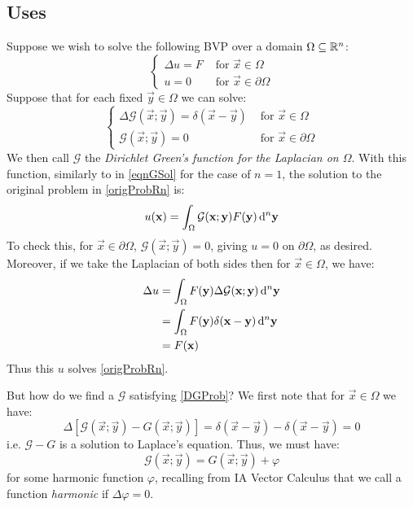 \documentclass[../main.tex]{subfiles}
\begin{document}
\subsection{Uses}
Suppose we wish to solve the following BVP over a domain $\Omega \subseteq \mathbb{R}^{n}$:
\begin{equation}
  \label{origProbRn}
  \begin{cases}
  \Delta u = F & \text{ for } \vec{x} \in \Omega \\
  u = 0 & \text{ for } \vec{x} \in \partial \Omega
  \end{cases}
\end{equation}
Suppose that for each fixed $\vec{y} \in \Omega$ we can solve:
\begin{equation}
  \label{DGProb}
  \begin{cases}
  \Delta \mathcal{G}(\vec{x}; \vec{y}) = \delta(\vec{x} - \vec{y}) & \text{ for } \vec{x} \in \Omega \\
  \mathcal{G}(\vec{x}; \vec{y}) = 0 & \text{ for } \vec{x} \in \partial \Omega
  \end{cases}
\end{equation}
We then call $\mathcal{G}$ the \textit{Dirichlet Green's function for the Laplacian on $\Omega$}.
With this function, similarly to in \cref{eqnGSol} for the case of $n = 1$, the solution to the original problem in \cref{origProbRn} is:
\begin{equation}
  u(\vec{x}) = \int_{\Omega} \mathcal{G}(\vec{x}; \vec{y}) F(\vec{y}) \d^{n}{\vec{y}} \label{RnSolution}
\end{equation}
To check this, for $\vec{x} \in \partial \Omega$, $\mathcal{G}(\vec{x}; \vec{y}) = 0$, giving $u = 0$ on $\partial \Omega$, as desired.
Moreover, if we take the Laplacian of both sides then for $\vec{x} \in \Omega$, we have:
\begin{align*}
  \Delta u &= \int_{\Omega} F(\vec{y}) \Delta \mathcal{G}(\vec{x}; \vec{y}) \d^{n}{\vec{y}} \\
           &= \int_{\Omega} F(\vec{y}) \delta(\vec{x} - \vec{y}) \d^{n}{\vec{y}} \\
           &= F(\vec{x})
\end{align*}
Thus this $u$ solves \cref{origProbRn}.

But how do we find a $\mathcal{G}$ satisfying \cref{DGProb}?
We first note that for $\vec{x} \in \Omega$ we have:
\[
  \Delta[\mathcal{G}(\vec{x}; \vec{y}) - G(\vec{x}; \vec{y})] = \delta(\vec{x} - \vec{y}) - \delta(\vec{x} - \vec{y}) = 0
\]
i.e. $\mathcal{G} - G$ is a solution to Laplace's equation.
Thus, we must have:
\[
  \mathcal{G}(\vec{x}; \vec{y}) = G(\vec{x}; \vec{y}) + \varphi
\]
for some harmonic function $\varphi$, recalling from IA Vector Calculus that we call a function \textit{harmonic} if $\Delta \varphi = 0$.
\end{document}
